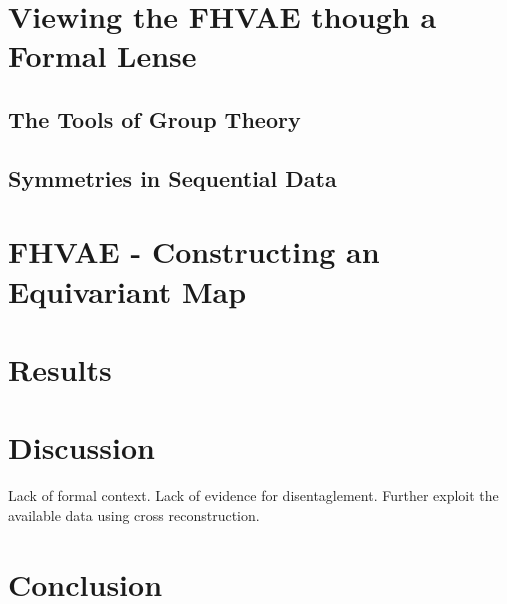 \documentclass{article} %
\begin{document}
\section*{Viewing the FHVAE though a Formal Lense}

\subsection*{The Tools of Group Theory}


\subsection*{Symmetries in Sequential Data}



\section*{FHVAE - Constructing an Equivariant Map}


\section*{Results}


\section*{Discussion}
Lack of formal context.
Lack of evidence for disentaglement.
Further exploit the available data using cross reconstruction.

\section*{Conclusion}



\newpage


\end{document}
